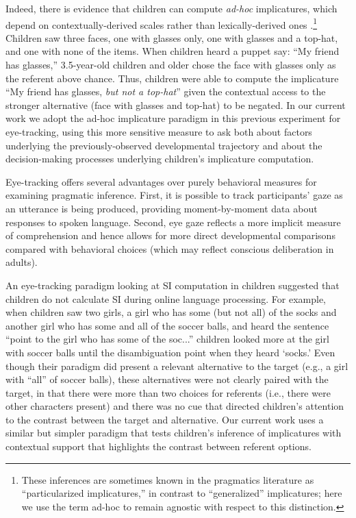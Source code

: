 \documentclass[10pt,letterpaper]{article}
\begin{document}
Indeed, there is evidence that children can compute \emph{ad-hoc} implicatures, which depend on contextually-derived scales rather than lexically-derived ones \cite{stillerLLD}.\footnote{These inferences are sometimes known in the pragmatics literature as ``particularized implicatures,'' in contrast to ``generalized'' implicatures; here we use the term ad-hoc to remain agnostic with respect to this distinction.} Children saw three faces, one with glasses only, one with glasses and a top-hat, and one with none of the items. When children heard a puppet say: ``My friend has glasses,'' 3.5-year-old children and older chose the face with glasses only as the referent above chance. Thus, children were able to compute the implicature ``My friend has glasses, \emph{but not a top-hat}'' given the contextual access to the stronger alternative (face with glasses and top-hat) to be negated. In our current work we adopt the ad-hoc implicature paradigm in this previous experiment for eye-tracking, using this more sensitive measure to ask both about factors underlying the previously-observed developmental trajectory and about the decision-making processes underlying children's implicature computation.

Eye-tracking offers several advantages over purely behavioral measures for examining pragmatic inference. First, it is possible to track participants' gaze as an utterance is being produced, providing moment-by-moment data about responses to spoken language. Second, eye gaze reflects a more implicit measure of comprehension and hence allows for more direct developmental comparisons compared with behavioral choices (which may reflect conscious deliberation in adults). 

An eye-tracking paradigm looking at SI computation in children \cite{huang2009semantic} suggested that children do not calculate SI during online language processing. For example, when children saw two girls, a girl who has some (but not all) of the socks and another girl who has some and all of the soccer balls, and heard the sentence ``point to the girl who has some of the soc...'' children looked more at the girl with soccer balls until the disambiguation point when they heard `socks.' Even though their paradigm did present a relevant alternative to the target (e.g., a girl with ``all'' of soccer balls), these alternatives were not clearly paired with the target, in that there were more than two choices for referents (i.e., there were other characters present) and there was no cue that directed children's attention to the contrast between the target and alternative. Our current work uses a similar but simpler paradigm that tests children's inference of implicatures with contextual support that highlights the contrast between referent options.
\end{document}
